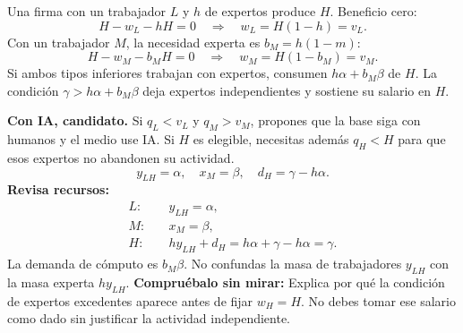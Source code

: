 \documentclass[11pt]{article}
\newcommand{\pregunta}[1]{\medskip\textbf{Compruébalo sin mirar:} #1\par}
\begin{document}
Una firma con un trabajador $L$ y $h$ de expertos produce $H$. Beneficio cero:
\[
H-w_L-hH=0\quad\Longrightarrow\quad w_L=H(1-h)=v_L.
\]
Con un trabajador $M$, la necesidad experta es $b_M=h(1-m)$:
\[
H-w_M-b_MH=0\quad\Longrightarrow\quad w_M=H(1-b_M)=v_M.
\]
Si ambos tipos inferiores trabajan con expertos, consumen $h\alpha+b_M\beta$ de $H$. La condición $\gamma>h\alpha+b_M\beta$ deja expertos independientes y sostiene su salario en $H$.

\textbf{Con IA, candidato.} Si $q_L<v_L$ y $q_M>v_M$, propones que la base siga con humanos y el medio use IA. Si $H$ es elegible, necesitas además $q_H<H$ para que esos expertos no abandonen su actividad.
\[
y_{LH}=\alpha,\quad x_M=\beta,\quad d_H=\gamma-h\alpha.
\]
\textbf{Revisa recursos:}
\begin{align*}
L:&\quad y_{LH}=\alpha,\\
M:&\quad x_M=\beta,\\
H:&\quad h y_{LH}+d_H=h\alpha+\gamma-h\alpha=\gamma.
\end{align*}
La demanda de cómputo es $b_M\beta$. No confundas la masa de trabajadores $y_{LH}$ con la masa experta $hy_{LH}$.
\pregunta{Explica por qué la condición de expertos excedentes aparece antes de fijar $w_H=H$. No debes tomar ese salario como dado sin justificar la actividad independiente.}
\newpage
\end{document}
